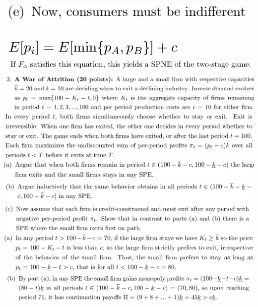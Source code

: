 \documentclass[8pt,landscape]{extarticle}
\begin{document}
\begin{multicols*}{3}
    \includegraphics[width=0.35\linewidth,keepaspectratio]{Screenshots/Screenshot 2024-03-11 170621.png}
    \includegraphics[width=0.23\linewidth,keepaspectratio]{Screenshots/Screenshot 2024-03-11 170625.png}
    \includegraphics[width=0.61\linewidth,keepaspectratio]{Screenshots/Screenshot 2024-03-11 170630.png}
    \includegraphics[width=0.77\linewidth,keepaspectratio]{Screenshots/Screenshot 2024-03-11 170641.png}
    \includegraphics[width=0.75\linewidth,keepaspectratio]{Screenshots/Screenshot 2024-03-11 170646.png}
    \includegraphics[width=0.72\linewidth,keepaspectratio]{Screenshots/Screenshot 2024-03-11 170653.png}
    \includegraphics[width=0.74\linewidth,keepaspectratio]{Screenshots/Screenshot 2024-03-11 170657.png}
    \includegraphics[width=0.75\linewidth,keepaspectratio]{Screenshots/Screenshot 2024-03-11 170700.png}
    \includegraphics[width=0.73\linewidth,keepaspectratio]{Screenshots/Screenshot 2024-03-11 170708.png}
    \includegraphics[width=0.76\linewidth,keepaspectratio]{Screenshots/Screenshot 2024-03-11 170711.png}

\end{multicols*}
\end{document}
